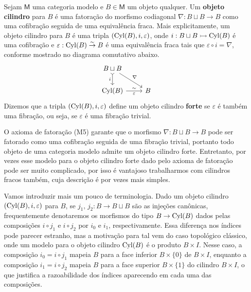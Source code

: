 \begin{defin}
  Sejam $\mathsf{M}$ uma categoria modelo e $B \in \mathsf{M}$ um objeto qualquer.
  Um \textbf{objeto cilindro} para $B$ é uma fatoração do morfismo codiagonal $\nabla: B \sqcup B \to B$ como uma cofibração seguida de uma equivalência fraca.
  Mais explicitamente, um objeto cilindro para $B$ é uma tripla $(\mathrm{Cyl}(B),i,\varepsilon)$, onde $i: B \sqcup B \rightarrowtail \mathrm{Cyl}(B)$ é uma cofibração e $\varepsilon: \mathrm{Cyl}(B) \overset{\sim}{\to} B$ é uma equivalência fraca tais que $\varepsilon \circ i = \nabla$, conforme mostrado no diagrama comutativo abaixo.
  \begin{displaymath}
    \begin{tikzcd}
      B \sqcup B
      \arrow[d, tail, "i" swap]
      \arrow[rd, "\nabla"]
      \\ \Cyl(B)
      \arrow[r, "\varepsilon" {swap}, "\sim"]
      & B
    \end{tikzcd}
  \end{displaymath}
  Dizemos que a tripla $(\mathrm{Cyl}(B),i,\varepsilon)$ define um objeto cilindro \textbf{forte} se $\varepsilon$ é também uma fibração, ou seja, se $\varepsilon$ é uma fibração trivial.
\end{defin}

\begin{obs}
  O axioma de fatoração (M5) garante que o morfismo $\nabla: B \sqcup B \to B$ pode ser fatorado como uma cofibração seguida de uma fibração trivial, portanto todo objeto de uma categoria modelo admite um objeto cilindro forte.
  Entretanto, por vezes esse modelo para o objeto cilindro forte dado pelo axioma de fatoração pode ser muito complicado, por isso é vantajoso trabalharmos com cilindros fracos também, cuja descrição é por vezes mais simples.
\end{obs}

Vamos introduzir mais um pouco de terminologia.
Dado  um objeto cilindro $(\mathrm{Cyl}(B),i,\varepsilon)$ para $B$, se $j_{1},\, j_{2}: B \to B \sqcup B$ são as injeções canônicas, frequentemente denotaremos os morfismos do tipo $B \to \mathrm{Cyl}(B)$ dados pelas composições $i \circ j_{1}$ e $i \circ j_{2}$ por $i_{0}$ e $i_{1}$, respectivamente.
Essa diferença nos índices pode parecer estranho, mas a motivação para tal vem do caso topológico clássico, onde um modelo para o objeto cilindro $\mathrm{Cyl}(B)$ é o produto $B \times I$.
Nesse caso, a composição $i_{0} = i \circ j_{1}$ mapeia $B$ para a face inferior $B \times \{0\}$ de $B \times I$, enquanto a composição $i_{1} = i \circ j_{2}$ mapeia $B$ para a face superior $B \times \{1\}$ do cilindro $B \times I$, o que justifica a razoabilidade dos índices aparecendo em cada uma das composições.

